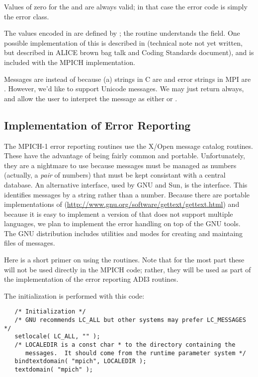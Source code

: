 \documentclass{article}
\begin{document}
Values of zero for the  and  are
always valid; in that case the error code is simply the error class.

The values encoded in  are defined by
; the routine 
understands the  field.  One possible implementation
of this is described in (technical note not yet written, but described
in ALICE brown bag talk and Coding Standards document), and is
included with the MPICH implementation.

Messages are  instead of  because (a)
strings in C are  and error strings in MPI are .  However, we'd like to support Unicode messages.  We may just
return  always, and allow the user to interpret the
message as either  or .



\subsection{Implementation of Error Reporting}
\label{sec:error-report-impl}
The MPICH-1 error reporting routines use the X/Open  message
catalog routines.  These have the advantage of being fairly common and
portable.  Unfortunately, they are a nightmare to use because messages must be
managed as numbers (actually, a \emph{pair} of numbers) that must be kept
consistant with a central database.  An 
alternative interface, used by GNU and Sun, is the  interface.
This identifies messages by a string rather than a number.
Because there are portable implementations of 
(\url{http://www.gnu.org/software/gettext/gettext.html}) and because it is
easy to implement a version of  that does not support multiple
languages, we plan to implement the error handling on top of the GNU
 tools.  The GNU  distribution includes utilities
and  modes for creating and maintaing files of messages.

Here is a short primer on using the  routines.  Note that for
the most part these will not be used directly in the MPICH code; rather, they
will be used as part of the implementation of the error reporting ADI3
routines.

The initialization is performed with this code:
\begin{verbatim}
   /* Initialization */
   /* GNU recommends LC_ALL but other systems may prefer LC_MESSAGES */
   setlocale( LC_ALL, "" );
   /* LOCALEDIR is a const char * to the directory containing the
      messages.  It should come from the runtime parameter system */
   bindtextdomain( "mpich", LOCALEDIR );
   textdomain( "mpich" );
\end{verbatim}
\end{document}

